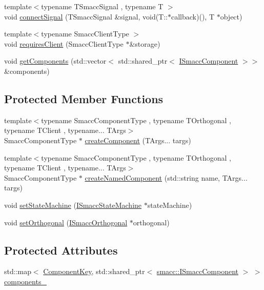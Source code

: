 \begin{DoxyCompactItemize}
\item 
{\footnotesize template$<$typename T\+Smacc\+Signal , typename T $>$ }\\void \hyperlink{classsmacc_1_1ISmaccClient_addce4ebcdebc5a7a3f80c0980862575d}{connect\+Signal} (T\+Smacc\+Signal \&signal, void(T\+::$\ast$callback)(), T $\ast$object)
\item 
{\footnotesize template$<$typename Smacc\+Client\+Type $>$ }\\void \hyperlink{classsmacc_1_1ISmaccClient_a7a9990a2f3e35d547671188d69fee520}{requires\+Client} (Smacc\+Client\+Type $\ast$\&storage)
\item 
void \hyperlink{classsmacc_1_1ISmaccClient_ac6db21c1ec7072178e9f7c721908e07d}{get\+Components} (std\+::vector$<$ std\+::shared\+\_\+ptr$<$ \hyperlink{classsmacc_1_1ISmaccComponent}{I\+Smacc\+Component} $>$$>$ \&components)
\end{DoxyCompactItemize}
\subsection*{Protected Member Functions}
\begin{DoxyCompactItemize}
\item 
{\footnotesize template$<$typename Smacc\+Component\+Type , typename T\+Orthogonal , typename T\+Client , typename... T\+Args$>$ }\\Smacc\+Component\+Type $\ast$ \hyperlink{classsmacc_1_1ISmaccClient_a5c1c8eb5e91a3b399662a52cb0ca86aa}{create\+Component} (T\+Args... targs)
\item 
{\footnotesize template$<$typename Smacc\+Component\+Type , typename T\+Orthogonal , typename T\+Client , typename... T\+Args$>$ }\\Smacc\+Component\+Type $\ast$ \hyperlink{classsmacc_1_1ISmaccClient_affcc2f95bc993b5f07ef0d6ab6eec8f1}{create\+Named\+Component} (std\+::string name, T\+Args... targs)
\item 
void \hyperlink{classsmacc_1_1ISmaccClient_a28fd6ca2bcf9c5e57f3cc16fb0a076d3}{set\+State\+Machine} (\hyperlink{classsmacc_1_1ISmaccStateMachine}{I\+Smacc\+State\+Machine} $\ast$state\+Machine)
\item 
void \hyperlink{classsmacc_1_1ISmaccClient_a40330788a976dc08e2f726d210564ec4}{set\+Orthogonal} (\hyperlink{classsmacc_1_1ISmaccOrthogonal}{I\+Smacc\+Orthogonal} $\ast$orthogonal)
\end{DoxyCompactItemize}
\subsection*{Protected Attributes}
\begin{DoxyCompactItemize}
\item 
std\+::map$<$ \hyperlink{structsmacc_1_1ComponentKey}{Component\+Key}, std\+::shared\+\_\+ptr$<$ \hyperlink{classsmacc_1_1ISmaccComponent}{smacc\+::\+I\+Smacc\+Component} $>$ $>$ \hyperlink{classsmacc_1_1ISmaccClient_a9e670e9071bb549dbeb08985d0114afe}{components\+\_\+}
\end{DoxyCompactItemize}
